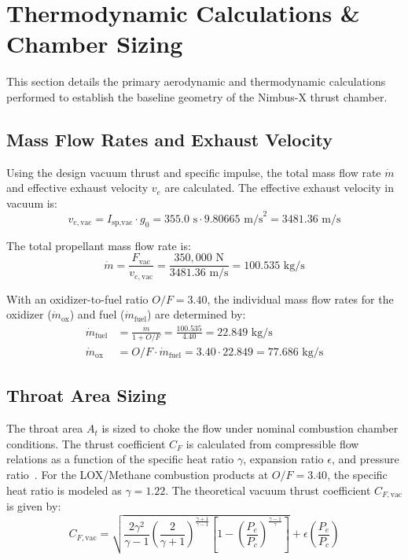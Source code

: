 \section{Thermodynamic Calculations \& Chamber Sizing}
This section details the primary aerodynamic and thermodynamic calculations performed to establish the baseline geometry of the Nimbus-X thrust chamber.

\subsection{Mass Flow Rates and Exhaust Velocity}
Using the design vacuum thrust and specific impulse, the total mass flow rate $\dot{m}$ and effective exhaust velocity $v_e$ are calculated. 
The effective exhaust velocity in vacuum is:
\begin{equation}
    v_{e,\text{vac}} = I_{\text{sp,vac}} \cdot g_0 = 355.0 \text{~s} \cdot 9.80665 \text{~m/s}^2 = 3481.36 \text{~m/s}
\end{equation}

The total propellant mass flow rate is:
\begin{equation}
    \dot{m} = \frac{F_{\text{vac}}}{v_{e,\text{vac}}} = \frac{350{,}000 \text{~N}}{3481.36 \text{~m/s}} = 100.535 \text{~kg/s}
\end{equation}

With an oxidizer-to-fuel ratio $O/F = 3.40$, the individual mass flow rates for the oxidizer ($\dot{m}_{\text{ox}}$) and fuel ($\dot{m}_{\text{fuel}}$) are determined by:
\begin{align}
    \dot{m}_{\text{fuel}} &= \frac{\dot{m}}{1 + O/F} = \frac{100.535}{4.40} = 22.849 \text{~kg/s} \\
    \dot{m}_{\text{ox}} &= O/F \cdot \dot{m}_{\text{fuel}} = 3.40 \cdot 22.849 = 77.686 \text{~kg/s}
\end{align}

\subsection{Throat Area Sizing}
The throat area $A_t$ is sized to choke the flow under nominal combustion chamber conditions. The thrust coefficient $C_F$ is calculated from compressible flow relations as a function of the specific heat ratio $\gamma$, expansion ratio $\epsilon$, and pressure ratio~\cite{Hill1992}.
For the LOX/Methane combustion products at $O/F = 3.40$, the specific heat ratio is modeled as $\gamma = 1.22$. The theoretical vacuum thrust coefficient $C_{F,\text{vac}}$ is given by:
\begin{equation}
    C_{F,\text{vac}} = \sqrt{\frac{2\gamma^2}{\gamma-1} \left(\frac{2}{\gamma+1}\right)^{\frac{\gamma+1}{\gamma-1}} \left[ 1 - \left(\frac{P_e}{P_c}\right)^{\frac{\gamma-1}{\gamma}} \right]} + \epsilon \left( \frac{P_e}{P_c} \right)
\end{equation}

